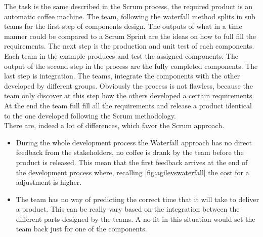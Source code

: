 \documentclass[../main.tex]{subfiles}
\begin{document}
The task is the same described in the Scrum process, the required product is an automatic coffee machine. The team, following the waterfall method splits in sub teams for the first step of components design. The outputs of what in a time manner could be compared to a Scrum Sprint are the ideas on how to full fill the requirements. The next step is the production and unit test of each components. Each team in the example produces and test the assigned components. The output of the second step in the process are the fully completed components. The last step is integration. The teams, integrate the components with the other developed by different groups. Obviously the process is not flawless, because the team only discover at this step how the others developed a certain requirements. At the end the team full fill all the requirements and release a product identical to the one developed following the Scrum methodology.\\ There are, indeed a lot of differences, which favor the Scrum approach.
\begin{itemize}
    \item During the whole development process the Waterfall approach has no direct feedback from the stakeholders, no coffee is drank by the team before the product is released. This mean that the first feedback arrives at the end of the development process where, recalling \ref{fig:agilevswaterfall} the cost for a adjustment is higher. 
    \item The team has no way of predicting the correct time that it will take to deliver a product. This can be really vary based on the integration between the different parts designed by the teams. A no fit in this situation would set the team back just for one of the components. 
\end{itemize}
\cleardoublepage
\end{document}
